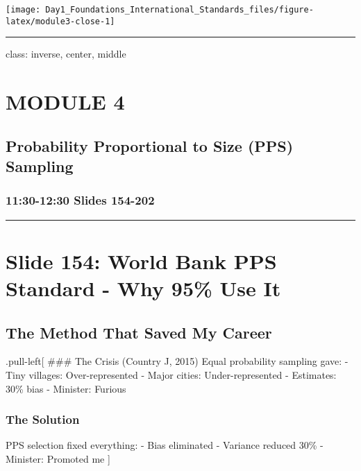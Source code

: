 \documentclass[
]{article}
\begin{document}
\texttt{[image: Day1\_Foundations\_International\_Standards\_files/figure-latex/module3-close-1]}

\begin{center}\rule{0.5\linewidth}{0.5pt}\end{center}

class: inverse, center, middle

\section{MODULE 4}\label{module-4}

\subsection{Probability Proportional to Size (PPS)
Sampling}\label{probability-proportional-to-size-pps-sampling}

\subsubsection{11:30-12:30 \textbar{} Slides
154-202}\label{slides-154-202}

\begin{center}\rule{0.5\linewidth}{0.5pt}\end{center}

\section{Slide 154: World Bank PPS Standard - Why 95\% Use
It}\label{slide-154-world-bank-pps-standard---why-95-use-it}

\subsection{The Method That Saved My
Career}\label{the-method-that-saved-my-career}

.pull-left{[} \#\#\# The Crisis (Country J, 2015) Equal probability
sampling gave: - Tiny villages: Over-represented - Major cities:
Under-represented - Estimates: 30\% bias - Minister: Furious

\subsubsection{The Solution}\label{the-solution-1}

PPS selection fixed everything: - Bias eliminated - Variance reduced
30\% - Minister: Promoted me {]}
\end{document}
